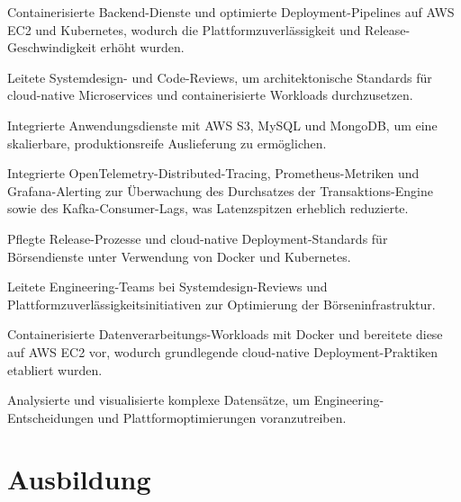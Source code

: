 \documentclass[10pt,a4paper]{resume}
\begin{document}
\bullets
  \item Containerisierte Backend-Dienste und optimierte Deployment-Pipelines auf AWS EC2 und Kubernetes, wodurch die Plattformzuverlässigkeit und Release-Geschwindigkeit erhöht wurden.
  \item Leitete Systemdesign- und Code-Reviews, um architektonische Standards für cloud-native Microservices und containerisierte Workloads durchzusetzen.
  \item Integrierte Anwendungsdienste mit AWS S3, MySQL und MongoDB, um eine skalierbare, produktionsreife Auslieferung zu ermöglichen.
\bulletsend
\vspace{1.5pt}
\bullets
  \item Integrierte OpenTelemetry-Distributed-Tracing, Prometheus-Metriken und Grafana-Alerting zur Überwachung des Durchsatzes der Transaktions-Engine sowie des Kafka-Consumer-Lags, was Latenzspitzen erheblich reduzierte.
  \item Pflegte Release-Prozesse und cloud-native Deployment-Standards für Börsendienste unter Verwendung von Docker und Kubernetes.
  \item Leitete Engineering-Teams bei Systemdesign-Reviews und Plattformzuverlässigkeitsinitiativen zur Optimierung der Börseninfrastruktur.
\bulletsend
\vspace{1.5pt}
\bullets
  \item Containerisierte Datenverarbeitungs-Workloads mit Docker und bereitete diese auf AWS EC2 vor, wodurch grundlegende cloud-native Deployment-Praktiken etabliert wurden.
  \item Analysierte und visualisierte komplexe Datensätze, um Engineering-Entscheidungen und Plattformoptimierungen voranzutreiben.
\bulletsend
\vspace{1.5pt}

\section{Ausbildung}

\vspace{2pt}
\end{document}
